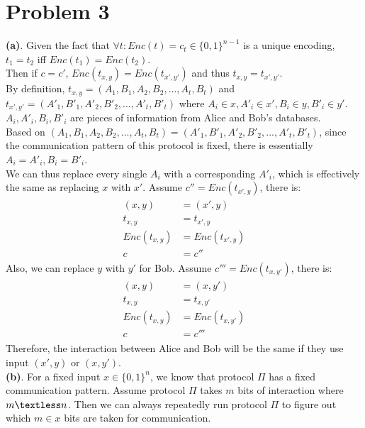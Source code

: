 \documentclass[titlepage, paper=a4, fontsize=11pt]{scrartcl} %
\numberwithin{equation}{section} %
\numberwithin{figure}{section} %
\numberwithin{table}{section} %
\begin{document}
\section*{Problem 3}
\textbf{(a)}. Given the fact that $\forall t: Enc(t)=c_t \in \{0,1\}^{n-1}$ is a unique encoding,
$t_1 = t_2$ iff $Enc(t_1)=Enc(t_2)$. \\

Then if $c=c'$, $Enc(t_{x,y})=Enc(t_{x',y'})$ and thus $t_{x,y}=t_{x',y'}$. \\
By definition, $t_{x,y}=(A_1, B_1, A_2, B_2, ..., A_t, B_t)$ and
$t_{x',y'}=(A'_1, B'_1, A'_2, B'_2, ..., A'_t, B'_t)$ where $A_i \in x, A'_i \in x', B_i \in y, B'_i \in y'$.
$A_i, A'_i, B_i, B'_i$ are pieces of information from Alice and Bob's databases. \\

Based on $(A_1, B_1, A_2, B_2, ..., A_t, B_t) = (A'_1, B'_1, A'_2, B'_2, ..., A'_t, B'_t)$,
since the communication pattern of this protocol is fixed, there is essentially $A_i = A'_i, B_i = B'_i$. \\

We can thus replace every single $A_i$ with a corresponding $A'_i$, which is effectively the same as replacing $x$ with $x'$. Assume $c'' = Enc(t_{x',y})$, there is:
\begin{align*} 
\begin{split}
(x,y) &= (x',y) \\
t_{x,y} &= t_{x',y} \\
Enc(t_{x,y}) &= Enc(t_{x',y}) \\
c &= c''
\end{split}					
\end{align*}
Also, we can replace $y$ with $y'$ for Bob. Assume $c''' = Enc(t_{x,y'})$, there is:
\begin{align*} 
\begin{split}
(x,y) &= (x,y') \\
t_{x,y} &= t_{x,y'} \\
Enc(t_{x,y}) &= Enc(t_{x,y'}) \\
c &= c'''
\end{split}					
\end{align*}
Therefore, the interaction between Alice and Bob will be the same if they use input $(x',y)$ or $(x,y')$. \\

\textbf{(b)}. For a fixed input $x \in \{0,1\}^n$, we know that protocol $\Pi$ has a fixed communication pattern.
Assume protocol $\Pi$ takes $m$ bits of interaction where $m \textless n$.
Then we can always repeatedly run protocol $\Pi$ to figure out which $m \in x$ bits are taken for communication. \\
\end{document}
